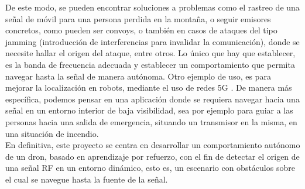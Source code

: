 De este modo, se pueden encontrar soluciones a problemas como el rastreo de una señal de móvil para una persona perdida en la montaña, o seguir emisores concretos, como pueden ser convoys, o también en casos de ataques del tipo jamming (introducción de interferencias para invalidar la comunicación), donde se necesite hallar el origen del ataque, entre otros. Lo único que hay que establecer, es la banda de frecuencia adecuada y establecer un comportamiento que permita navegar hasta la señal de manera autónoma. Otro ejemplo de uso, es para mejorar la localización en robots, mediante el uso de redes 5G \cite{s23010188}. De manera más específica, podemos pensar en una aplicación donde se requiera navegar hacia una señal en un entorno interior de baja visibilidad, sea por ejemplo para guiar a las personas hacia una salida de emergencia, situando un transmisor en la misma, en una situación de incendio.\\

En definitiva, este proyecto se centra en desarrollar un comportamiento autónomo de un dron, basado en aprendizaje por refuerzo, con el fin de detectar el origen de una señal \ac{RF} en un entorno dinámico, esto es, un escenario con obstáculos sobre el cual se navegue hasta la fuente de la señal.